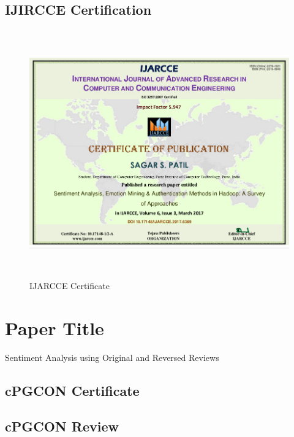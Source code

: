 \documentclass[oneside,a4paper,12pt]{pictreport}
\begin{document}
\subsection{IJIRCCE Certification}
\begin{figure}[!h]
\includegraphics[width=5.5in,height=4.2in]{ijarcce.png}
\caption{IJARCCE Certificate}
\end{figure}
\section{Paper Title}
Sentiment Analysis using Original and Reversed Reviews
\subsection{cPGCON Certificate}
\subsection{cPGCON Review}
\end{document}
